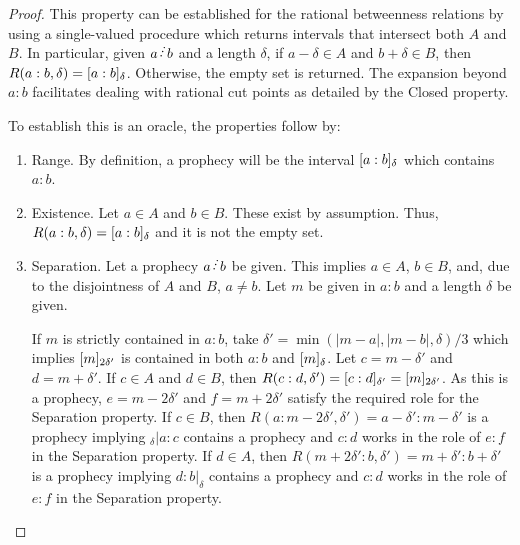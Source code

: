 \documentclass[12pt]{article}
\begin{document}
\begin{proof}
This property can be established for the rational betweenness relations by using a single-valued procedure which returns intervals that intersect both $A$ and $B$. In particular, given $a \lte b$ and a length $\delta$, if $a-\delta \in A$ and $b+\delta \in B$, then $R(a:b, \delta) = \halo{a:b}$. Otherwise, the empty set is returned. The expansion beyond $a:b$ facilitates dealing with rational cut points as detailed by the Closed property. 

To establish this is an oracle, the properties follow by: 
\begin{enumerate}
    \item Range. By definition, a prophecy will be the interval $\halo{a:b}$ which contains $a:b$. 
    
    \item Existence. Let $a \in A$ and $b \in B$. These exist by assumption. Thus, $R(a:b, \delta)= \halo{a:b}$  and it is not the empty set.
    
    \item Separation. Let a prophecy $a \lte b$ be given. This implies $a \in A$, $b \in B$, and, due to the disjointness of $A$ and $B$, $a \neq b$. Let $m$ be given in $a:b$ and a length $\delta$ be given. 
    
    If $m$ is strictly contained in $a:b$, take $\delta'= \min(|m-a|, |m-b|, \delta)/3$ which implies $\halo[2\delta']{m}$ is contained in both $a:b$ and $\halo{m}$.  Let $c = m-\delta'$ and $d=m+\delta'$. If $c \in A$ and $d \in B$, then $R(c:d, \delta') = \halo[\delta']{c:d} = \halo[2 \delta']{m}$. As this is a prophecy, $e = m - 2 \delta'$ and $f = m + 2 \delta'$ satisfy the required role for the Separation property. If $ c\in B$, then $R(a:m-2\delta', \delta') = a-\delta':m-\delta'$ is a prophecy implying ${}_\delta| a : c$ contains a prophecy and $c:d$ works in the role of $e:f$ in the Separation property. If $d \in A$, then $R(m+2\delta':b, \delta') = m+\delta':b+\delta'$ is a prophecy implying $d:b|_{\delta}$ contains a prophecy and $c:d$ works in the role of $e:f$ in the Separation property. 


\end{enumerate}
\end{proof}
\end{document}
